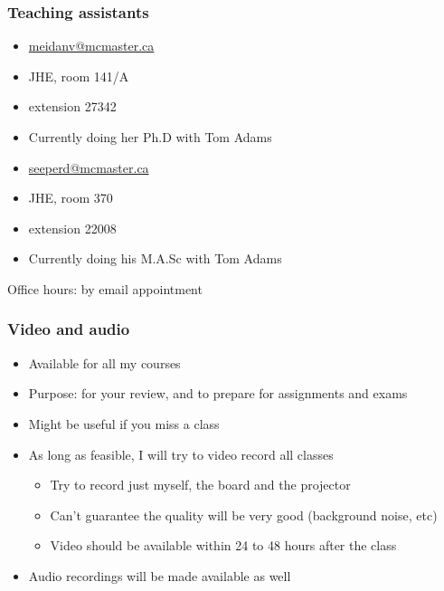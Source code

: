 \begin{frame}\frametitle{Teaching assistants}
	\vspace{12pt}
	{\color{myGreen}{Vida Meidanshahi}}
	\begin{itemize}
		\item	\url{meidanv@mcmaster.ca}
		\item	JHE, room 141/A
		\item	extension 27342
		\item	Currently doing her Ph.D with Tom Adams
	\end{itemize}
	
	\vspace{24pt}
	
	{\color{myGreen}{Dominik Seepersad}}
	\begin{itemize}
		\item	\url{seeperd@mcmaster.ca}
		\item	JHE, room 370
		\item	extension 22008
		\item	Currently doing his M.A.Sc with Tom Adams
	\end{itemize}
	\vspace{24pt}
	Office hours: by email appointment
\end{frame}

\begin{frame}\frametitle{Video and audio}
	\begin{itemize}
		\item	Available for all my courses
		\item	Purpose: for your review, and to prepare for assignments and exams 
		\item	Might be useful if you miss a class
		\item	As long as feasible, I will try to video record all classes
		\begin{itemize}
			\item	Try to record just myself, the board and the projector 
			\item	Can't guarantee the quality will be very good (background noise, etc) 
			\item	Video should be available within 24 to 48 hours after the class 
		\end{itemize}
		\item	Audio recordings will be made available as well 
	\end{itemize}
\end{frame}

